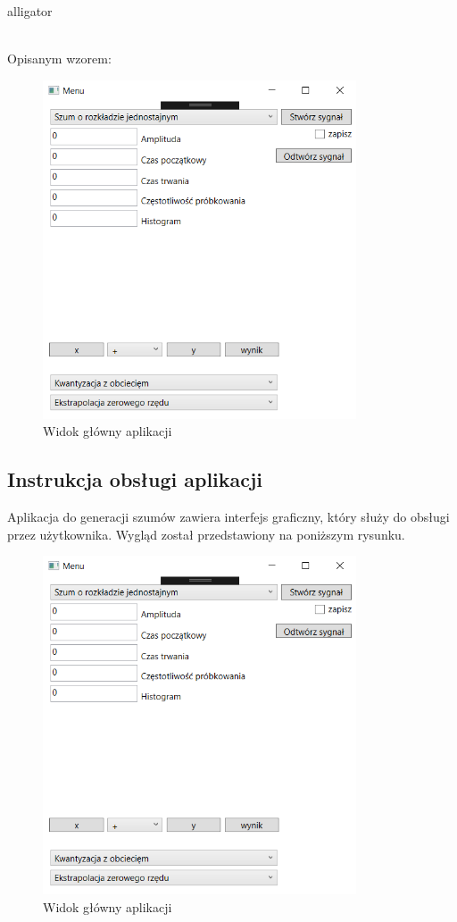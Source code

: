\documentclass[12pt]{article}
\begin{document}
\begin{labeling}{alligator}
\begin{figure}[h!]
 \vspace{-0.3cm}
 \label{Splot_indeks}
\end{figure}
\\Opisanym wzorem:
\begin{figure}[h!]
 \centering
 \includegraphics[width=9.3cm]{ui1.PNG}
 \vspace{-0.3cm}
 \caption{Widok główny aplikacji}
 \label{Widok_aplikacjis}
\end{figure}

\end{labeling}


\subsection{Instrukcja obsługi aplikacji}
Aplikacja do generacji szumów zawiera interfejs graficzny, który służy do obsługi przez użytkownika. Wygląd został przedstawiony na poniższym rysunku.
\newpage
\begin{figure}[h!]
 \centering
 \includegraphics[width=9.3cm]{ui1.PNG}
 \vspace{-0.3cm}
 \caption{Widok główny aplikacji}
 \label{Widok_aplikacjis}
\end{figure}
\end{document}
